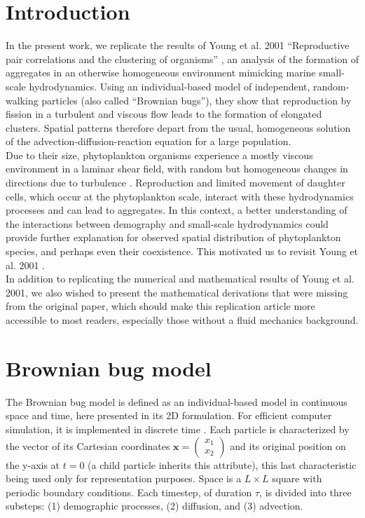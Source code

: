 
\section*{Introduction}

In the present work, we replicate the results of Young et al. 2001 ``Reproductive pair correlations and the clustering of organisms'' \cite{young_reproductive_2001}, an analysis of the formation of aggregates in an otherwise homogeneous environment mimicking marine small-scale hydrodynamics. Using an individual-based model of independent, random-walking particles (also called ``Brownian bugs''), they show that reproduction by fission in a turbulent \cite{tennekes1972first} and viscous flow leads to the formation of elongated clusters. Spatial patterns therefore depart from the usual, homogeneous solution of the advection-diffusion-reaction equation for a large population. \\

Due to their size, phytoplankton organisms experience a mostly viscous environment in a laminar shear field, with random but homogeneous changes in directions due to turbulence  \citep{dusenbery2009living, peters_effects_2000}. Reproduction and limited movement of daughter cells, which occur at the phytoplankton scale, interact with these hydrodynamics processes and can lead to aggregates.  In this context, a better understanding of the interactions between demography and small-scale hydrodynamics could provide further explanation for observed spatial distribution of phytoplankton species, and perhaps even their coexistence. This motivated us to revisit Young et al. 2001 \cite{young_reproductive_2001}. \\

In addition to replicating the numerical and mathematical results of Young et al. 2001, we also wished to present the mathematical derivations that were missing from the original paper, which should make this replication article more accessible to most readers, especially those without a fluid mechanics background. 

\section*{Brownian bug model}
The Brownian bug model is defined as an individual-based model in continuous space and time, here presented in its 2D formulation. For efficient computer simulation, it is implemented in discrete time \cite{young_reproductive_2001}. Each particle is characterized by the vector of its Cartesian coordinates $\boldsymbol{x}=\begin{pmatrix} 
      x_1\\ 
      x_2 
\end{pmatrix}$ and its original position on the y-axis at $t=0$ (a child particle inherits this attribute), this last characteristic being used only for representation purposes. Space is a $L\times L$ square with periodic boundary conditions. Each timestep, of duration $\tau$, is divided into three substeps: (1) demographic processes, (2) diffusion, and (3) advection. \\

